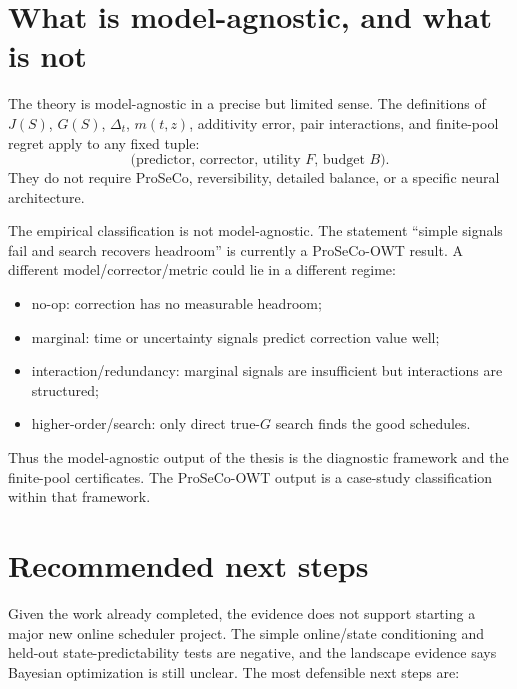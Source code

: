 \documentclass[11pt]{article}
\begin{document}
\section*{What is model-agnostic, and what is not}

The theory is model-agnostic in a precise but limited sense.  The definitions
of \(J(S)\), \(G(S)\), \(\Delta_t\), \(m(t,z)\), additivity error, pair
interactions, and finite-pool regret apply to any fixed tuple:
\[
\text{(predictor, corrector, utility }F\text{, budget }B\text{)}.
\]
They do not require ProSeCo, reversibility, detailed balance, or a specific
neural architecture.

The empirical classification is not model-agnostic.  The statement
``simple signals fail and search recovers headroom'' is currently a
ProSeCo-OWT result.  A different model/corrector/metric could lie in a
different regime:
\begin{itemize}
\item no-op: correction has no measurable headroom;
\item marginal: time or uncertainty signals predict correction value well;
\item interaction/redundancy: marginal signals are insufficient but
interactions are structured;
\item higher-order/search: only direct true-\(G\) search finds the good
schedules.
\end{itemize}

\noindent
Thus the model-agnostic output of the thesis is the diagnostic framework and
the finite-pool certificates.  The ProSeCo-OWT output is a case-study
classification within that framework.

\section*{Recommended next steps}

Given the work already completed, the evidence does not support starting a
major new online scheduler project.  The simple online/state conditioning and
held-out state-predictability tests are negative, and the landscape evidence
says Bayesian optimization is still unclear.  The most defensible next steps
are:
\end{document}
